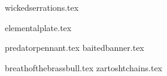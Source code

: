 
\raggedcolumns
\begin{multicols}{2}

\subtitle{\weaponenchantments}
\startsortedpricelist

{wickedserrations.tex}

\endsortedpricelist


\subtitle{\armourenchantments}
\startsortedpricelist

{elementalplate.tex}


\endsortedpricelist


\subtitle{\bannerenchantments}
\startsortedpricelist

{predatorpennant.tex}
{baitedbanner.tex}

\endsortedpricelist


\subtitle{\artefacts}
\startsortedpricelist

{breathofthebrassbull.tex}
{zartoshtchains.tex}

\endsortedpricelist
\end{multicols}
